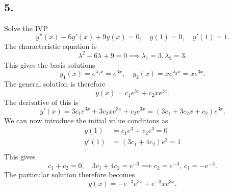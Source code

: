 \subsection*{5.} Solve the IVP
\[ 
y''(x) - 6y'(x) + 9y(x) = 0, \quad y(1) = 0, \quad y'(1) = 1
.\]
\bigbreak
The characteristic equation is
\[ 
\lambda^2 - 6\lambda + 9 = 0 \implies \lambda_1 = 3, \lambda_2 = 3
.\]
This gives the basis solutions
\[ 
y_1(x) = e^{\lambda_1 x} = e^{3x}, \quad y_2(x) = x e^{\lambda_2 x} = x e^{3x}
.\]
The general solution is therefore
\[ 
y(x) = c_1 e^{3x} + c_2 x e^{3x}
.\]
The derivative of this is
\[ 
y'(x) = 3c_1 e^{3x} + 3c_2 x e^{3x} + c_2 e^{3x} = \left( 3c_1 + 3c_2x + c_2 \right)e^{3x}
.\]
We can now introduce the initial value conditions as
\begin{align*}
  y(1) &= c_1 e^{3} + c_2 e^{3} = 0 \\
  y'(1) &= \left( 3c_1 + 4c_2 \right) e^{3} = 1 \\
.\end{align*}
This gives
\[ 
c_1 + c_2 = 0, \quad 3c_1 + 4c_2 = e^{-3} \implies c_2 = e^{-3}, \, c_1 = -e^{-3}
.\]
The particular solution therefore becomes
\[ 
  y(x) = - e^{-3} e^{3x} + e^{-3} x e^{3x}
.\]

